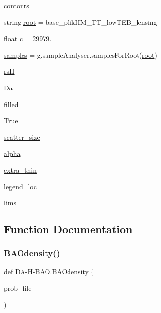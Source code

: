 \begin{DoxyCompactItemize}
\item 
\mbox{\hyperlink{namespaceDA-H-BAO_a41e15db1b442abfce1035d4079e42ef9}{contours}}
\item 
string \mbox{\hyperlink{namespaceDA-H-BAO_a6e2eec154420e213caf6c80494188a16}{root}} = \textquotesingle{}base\+\_\+plik\+H\+M\+\_\+\+T\+T\+\_\+low\+T\+E\+B\+\_\+lensing\textquotesingle{}
\item 
float \mbox{\hyperlink{namespaceDA-H-BAO_a46be8ff9e149d52499b170dfd3ebc857}{c}} = 29979.
\item 
\mbox{\hyperlink{namespaceDA-H-BAO_a21996e2084da31e693af71a0bb61918b}{samples}} = g.\+sample\+Analyser.\+samples\+For\+Root(\mbox{\hyperlink{namespaceDA-H-BAO_a6e2eec154420e213caf6c80494188a16}{root}})
\item 
\mbox{\hyperlink{namespaceDA-H-BAO_a2fe333a1d3023039d2fc4abcfe63462c}{rsH}}
\item 
\mbox{\hyperlink{namespaceDA-H-BAO_a5362e5d5614f1193a561617248ff16f8}{Da}}
\item 
\mbox{\hyperlink{namespaceDA-H-BAO_a856ce133cc51251d664df4470b99860f}{filled}}
\item 
\mbox{\hyperlink{namespaceDA-H-BAO_a8ee57864b6ab9f26b5745c6f0a30304a}{True}}
\item 
\mbox{\hyperlink{namespaceDA-H-BAO_a04d961f655b4aff191d138794f4fc1e3}{scatter\+\_\+size}}
\item 
\mbox{\hyperlink{namespaceDA-H-BAO_aa45eb34ce971f62515d0abcd74b29112}{alpha}}
\item 
\mbox{\hyperlink{namespaceDA-H-BAO_a918edd43521309f8f7fc1a5532a2b2a6}{extra\+\_\+thin}}
\item 
\mbox{\hyperlink{namespaceDA-H-BAO_a0da8382cf6dbec19c8ca572d626119a5}{legend\+\_\+loc}}
\item 
\mbox{\hyperlink{namespaceDA-H-BAO_a71da5ade75da49f147c72a09ccbf17f7}{lims}}
\end{DoxyCompactItemize}


\subsection{Function Documentation}
\mbox{\label{namespaceDA-H-BAO_aaf711c43bd7501db365be36cc65b28af}} 
\subsubsection{\texorpdfstring{B\+A\+Odensity()}{BAOdensity()}}
{\footnotesize\ttfamily def DA-\/H-\/B\+A\+O.\+B\+A\+Odensity (\begin{DoxyParamCaption}\item[{}]{prob\+\_\+file }\end{DoxyParamCaption})}

